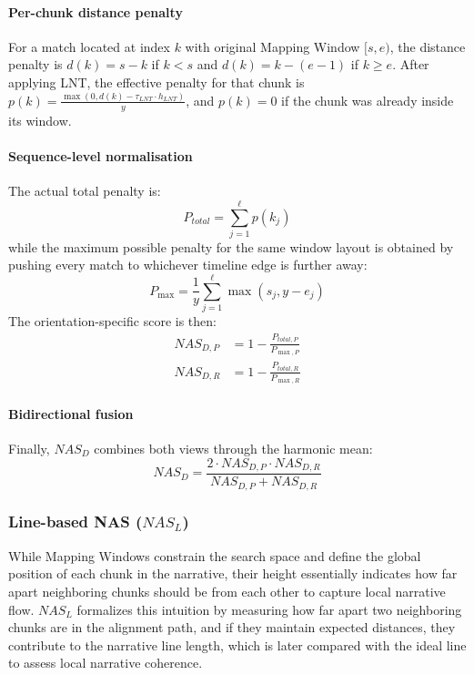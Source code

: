 \documentclass[main.tex]{subfiles}
\begin{document}
\paragraph{Per-chunk distance penalty}
For a match located at index $k$ with original Mapping Window $[s, e)$, the distance penalty is $d(k) = s - k$ if $k < s$ and $d(k) = k - (e - 1)$ if $k \geq e$. After applying LNT, the effective penalty for that chunk is $p(k) = \frac{\max(0, d(k) - \tau_{LNT} \cdot h_{LNT})}{y}$,
and $p(k) = 0$ if the chunk was already inside its window.

\paragraph{Sequence-level normalisation}
The actual total penalty is:
\begin{equation}
P_{total} = \sum_{j=1}^{\ell} p(k_j)
\end{equation}
while the maximum possible penalty for the same window layout is obtained by pushing every match to whichever timeline edge is further away:
\begin{equation}
P_{\max} = \frac{1}{y} \sum_{j=1}^{\ell} \max(s_j, y - e_j)
\end{equation}
The orientation-specific score is then:
\begin{align}
NAS_{D,P} &= 1 - \frac{P_{total,P}}{P_{\max,P}} \\
NAS_{D,R} &= 1 - \frac{P_{total,R}}{P_{\max,R}}
\end{align}

\paragraph{Bidirectional fusion}
Finally, $NAS_D$ combines both views through the harmonic mean:
\begin{equation}
NAS_D = \frac{2 \cdot NAS_{D,P} \cdot NAS_{D,R}}{NAS_{D,P} + NAS_{D,R}}
\end{equation}

\subsubsection{Line-based NAS ($NAS_L$)}
While Mapping Windows constrain the search space and define the global position of each chunk in the narrative, their height essentially indicates how far apart neighboring chunks should be from each other to capture local narrative flow. $NAS_L$ formalizes this intuition by measuring how far apart two neighboring chunks are in the alignment path, and if they maintain expected distances, they contribute to the narrative line length, which is later compared with the ideal line to assess local narrative coherence.
\end{document}
